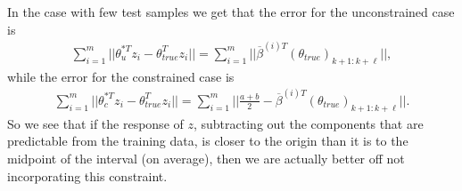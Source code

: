 \documentclass[12pt]{article}
\begin{document}
In the case with few test samples we get that the error for the unconstrained case is 
\begin{align*}
\sum \limits_{i=1}^{m} \lvert \lvert \theta_{u}^{*T}z_{i} - \theta_{true}^{T}z_{i} \lvert \lvert = \sum \limits_{i=1}^{m} \lvert \lvert \overline{\beta}^{(i)T} (\theta_{true})_{k+1:k+\ell} \lvert \lvert ,
\end{align*}
while the error for the constrained case is 
\begin{align*}
\sum \limits_{i=1}^{m} \lvert \lvert \theta_{c}^{*T}z_{i} - \theta_{true}^{T}z_{i} \lvert \lvert = \sum \limits_{i=1}^{m} \lvert \lvert \frac{a+b}{2} - \overline{\beta}^{(i)T} (\theta_{true})_{k+1:k+\ell} \lvert \lvert .
\end{align*}
So we see that if the response of $z$, subtracting out the components that are predictable from the training data, is closer to the origin than it is to the midpoint of the interval (on average), then we are actually better off not incorporating this constraint. 
  
\end{document}
